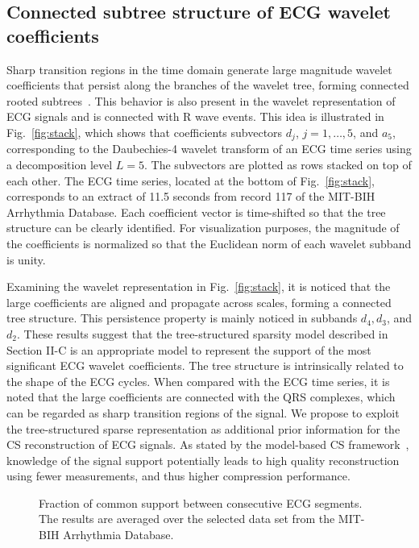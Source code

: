 \documentclass[journal]{IEEEtran}
\begin{document}
\subsection{Connected subtree structure of ECG wavelet coefficients}
Sharp transition regions in the time domain generate large magnitude wavelet coefficients that persist along the branches of the wavelet tree, forming connected rooted subtrees~\cite{Crou98}. This behavior is also present in the wavelet representation of ECG signals and is connected with R wave events. This idea is illustrated in Fig.~\ref{fig:stack}, which shows that coefficients subvectors $d_{j}$, $j=1,\ldots,5$, and $a_5$, corresponding to the Daubechies-4 wavelet transform of an ECG time series using a decomposition level $L=5$. The subvectors are plotted as rows stacked on top of each other. The ECG time series, located at the bottom of Fig.~\ref{fig:stack}, corresponds to an extract of 11.5 seconds from record 117 of the MIT-BIH Arrhythmia Database. Each coefficient vector is time-shifted so that the tree structure can be clearly identified. For visualization purposes, the magnitude of the coefficients is normalized so that the Euclidean norm of each wavelet subband is unity.

Examining the wavelet representation in Fig.~\ref{fig:stack}, it is noticed that the large coefficients are aligned and propagate across scales, forming a connected tree structure. This persistence property is mainly noticed in subbands $d_4, d_3$, and $d_2$. These results suggest that the tree-structured sparsity model described in Section II-C is an appropriate model to represent the support of the most significant ECG wavelet coefficients. The tree structure is intrinsically related to the shape of the ECG cycles. When compared with the ECG time series, it is noted that the large coefficients are connected with the QRS complexes, which can be regarded as sharp transition regions of the signal. We propose to exploit the tree-structured sparse representation as additional prior information for the CS reconstruction of ECG signals. As stated by the model-based CS framework~\cite{Bara10}, knowledge of the signal support potentially leads to high quality reconstruction using fewer measurements, and thus higher compression performance.
\begin{figure}[t]
\caption{Fraction of common support between consecutive ECG segments. The results are averaged over the selected data set from the MIT-BIH Arrhythmia Database.} \label{fig:2}
\end{figure}
\end{document}
